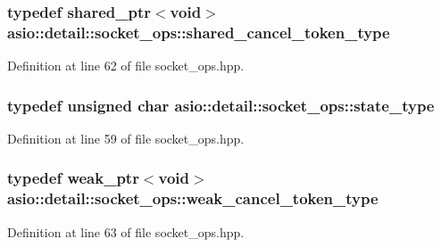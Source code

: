 \subsubsection[{shared\+\_\+cancel\+\_\+token\+\_\+type}]{\setlength{\rightskip}{0pt plus 5cm}typedef shared\+\_\+ptr$<$void$>$ {\bf asio\+::detail\+::socket\+\_\+ops\+::shared\+\_\+cancel\+\_\+token\+\_\+type}}\label{namespaceasio_1_1detail_1_1socket__ops_a6f7dec33c65c050a3ee96d6b17dafc9c}


Definition at line 62 of file socket\+\_\+ops.\+hpp.

\hypertarget{namespaceasio_1_1detail_1_1socket__ops_a5ce32ee297edef8833113ea35a933054}{}
\subsubsection[{state\+\_\+type}]{\setlength{\rightskip}{0pt plus 5cm}typedef unsigned char {\bf asio\+::detail\+::socket\+\_\+ops\+::state\+\_\+type}}\label{namespaceasio_1_1detail_1_1socket__ops_a5ce32ee297edef8833113ea35a933054}


Definition at line 59 of file socket\+\_\+ops.\+hpp.

\hypertarget{namespaceasio_1_1detail_1_1socket__ops_a9dbe5bfa22a69dc9a583a8060228860f}{}
\subsubsection[{weak\+\_\+cancel\+\_\+token\+\_\+type}]{\setlength{\rightskip}{0pt plus 5cm}typedef weak\+\_\+ptr$<$void$>$ {\bf asio\+::detail\+::socket\+\_\+ops\+::weak\+\_\+cancel\+\_\+token\+\_\+type}}\label{namespaceasio_1_1detail_1_1socket__ops_a9dbe5bfa22a69dc9a583a8060228860f}


Definition at line 63 of file socket\+\_\+ops.\+hpp.



